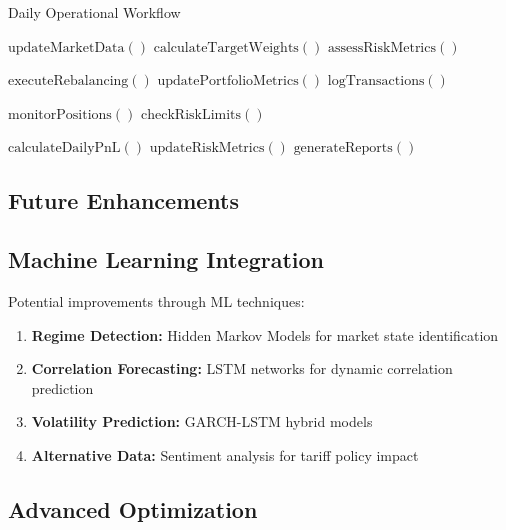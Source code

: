 \documentclass[11pt]{IEEEtran}
\begin{document}
\begin{algorithm}
\caption{Daily Operational Workflow}
\label{alg:operational}
\begin{algorithmic}[1]
    \State $\text{updateMarketData}()$ 
    \State $\text{calculateTargetWeights}()$
    \State $\text{assessRiskMetrics}()$
    
     
        \State $\text{executeRebalancing}()$
        \State $\text{updatePortfolioMetrics}()$
        \State $\text{logTransactions}()$
    \EndIf
    
    \State $\text{monitorPositions}()$ 
    \State $\text{checkRiskLimits}()$
    
    \State $\text{calculateDailyPnL}()$ 
    \State $\text{updateRiskMetrics}()$
    \State $\text{generateReports}()$
\EndFunction
\end{algorithmic}
\end{algorithm}

\begin{multicols}{2}

\section{Future Enhancements}

\subsection{Machine Learning Integration}

Potential improvements through ML techniques:
\begin{enumerate}
    \item \textbf{Regime Detection:} Hidden Markov Models for market state identification
    \item \textbf{Correlation Forecasting:} LSTM networks for dynamic correlation prediction
    \item \textbf{Volatility Prediction:} GARCH-LSTM hybrid models
    \item \textbf{Alternative Data:} Sentiment analysis for tariff policy impact
\end{enumerate}

\end{multicols}

\subsection{Advanced Optimization}
\end{document}
